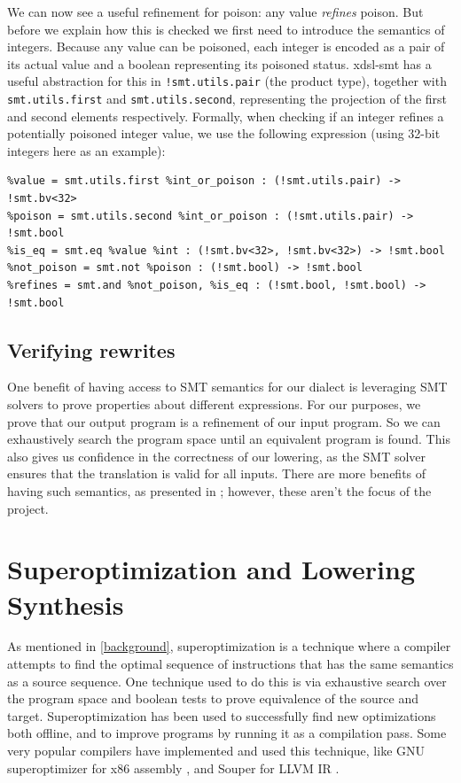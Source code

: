 We can now see a useful refinement for poison: any value \emph{refines} poison. But before we explain
how this is checked we first need to introduce the semantics of integers. Because any value can be poisoned,
each integer is encoded as a pair of its actual value and a boolean representing its poisoned status.
xdsl-smt has a useful abstraction for this in \texttt{!smt.utils.pair} (the product type), 
together with \texttt{smt.utils.first} and \texttt{smt.utils.second}, representing the projection of 
the first and second elements respectively.
Formally, when checking if an integer refines a potentially poisoned integer value, we use the following
expression (using 32-bit integers here as an example):
\begin{verbatim}
%value = smt.utils.first %int_or_poison : (!smt.utils.pair) -> !smt.bv<32>
%poison = smt.utils.second %int_or_poison : (!smt.utils.pair) -> !smt.bool
%is_eq = smt.eq %value %int : (!smt.bv<32>, !smt.bv<32>) -> !smt.bool
%not_poison = smt.not %poison : (!smt.bool) -> !smt.bool
%refines = smt.and %not_poison, %is_eq : (!smt.bool, !smt.bool) -> !smt.bool 
\end{verbatim}

\subsection{Verifying rewrites}
One benefit of having access to SMT semantics for our dialect is leveraging SMT solvers to 
prove properties about different expressions. For our purposes, we prove that our output program 
is a refinement of our input program. So we can exhaustively search the program space until
an equivalent program is found. This also gives us confidence in the correctness of our lowering,
as the SMT solver ensures that the translation is valid for all inputs.
%
There are more benefits of having such semantics, as presented in \cite{smt-mlir}; however, these
aren't the focus of the project.

\section{Superoptimization and Lowering Synthesis}

As mentioned in \ref{background}, superoptimization is a technique where a compiler 
attempts to find the optimal sequence of instructions that has the same semantics as a source
sequence. One technique used to do this is via exhaustive search over the program space and boolean 
tests to prove equivalence of the source and target.
%
Superoptimization has been used to successfully find new optimizations both offline, and to improve
programs by running it as a compilation pass. Some very popular compilers have 
implemented and used this technique, like GNU superoptimizer for x86 assembly \cite{gnu-superopt},
and Souper for LLVM IR \cite{souper}.


